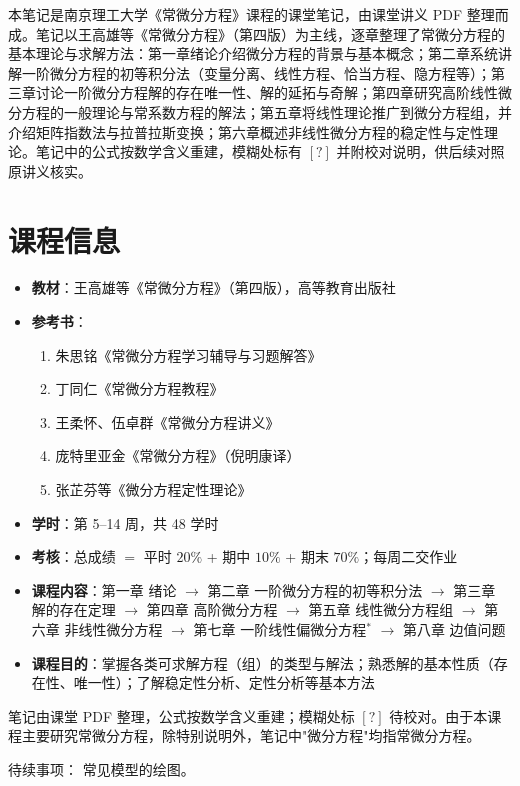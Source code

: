 本笔记是南京理工大学《常微分方程》课程的课堂笔记，由课堂讲义 PDF 整理而成。笔记以王高雄等《常微分方程》（第四版）为主线，逐章整理了常微分方程的基本理论与求解方法：第一章绪论介绍微分方程的背景与基本概念；第二章系统讲解一阶微分方程的初等积分法（变量分离、线性方程、恰当方程、隐方程等）；第三章讨论一阶微分方程解的存在唯一性、解的延拓与奇解；第四章研究高阶线性微分方程的一般理论与常系数方程的解法；第五章将线性理论推广到微分方程组，并介绍矩阵指数法与拉普拉斯变换；第六章概述非线性微分方程的稳定性与定性理论。笔记中的公式按数学含义重建，模糊处标有 $[?]$ 并附校对说明，供后续对照原讲义核实。

\section*{课程信息}

\begin{itemize}
    \item \textbf{教材}：王高雄等《常微分方程》（第四版），高等教育出版社
    \item \textbf{参考书}：
    \begin{enumerate}
        \item 朱思铭《常微分方程学习辅导与习题解答》
        \item 丁同仁《常微分方程教程》
        \item 王柔怀、伍卓群《常微分方程讲义》
        \item 庞特里亚金《常微分方程》（倪明康译）
        \item 张芷芬等《微分方程定性理论》
    \end{enumerate}
    \item \textbf{学时}：第 5--14 周，共 48 学时
    \item \textbf{考核}：总成绩 $=$ 平时 $20\%$ + 期中 $10\%$ + 期末 $70\%$；每周二交作业
    \item \textbf{课程内容}：第一章 绪论 $\rightarrow$ 第二章 一阶微分方程的初等积分法 $\rightarrow$ 第三章 解的存在定理 $\rightarrow$ 第四章 高阶微分方程 $\rightarrow$ 第五章 线性微分方程组 $\rightarrow$ 第六章 非线性微分方程 $\rightarrow$ 第七章 一阶线性偏微分方程$^{*}$ $\rightarrow$ 第八章 边值问题
    \item \textbf{课程目的}：掌握各类可求解方程（组）的类型与解法；熟悉解的基本性质（存在性、唯一性）；了解稳定性分析、定性分析等基本方法
\end{itemize}

\noindent 笔记由课堂 PDF 整理，公式按数学含义重建；模糊处标 $[?]$ 待校对。由于本课程主要研究常微分方程，除特别说明外，笔记中"微分方程"均指常微分方程。

待续事项：
常见模型的绘图。
